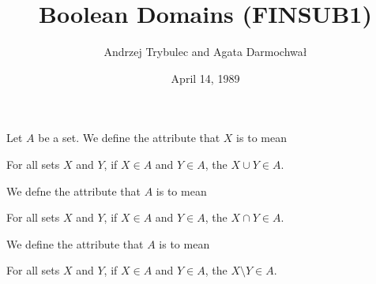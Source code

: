 \documentclass{article}
\title{Boolean Domains (FINSUB1)}
\author{Andrzej Trybulec and Agata Darmochwa\l}
\date{April 14, 1989}
\begin{document}
\maketitle

\begin{definition}
Let $A$ be a set.
We define the attribute that $X$ is  to mean
\begin{defn}
\item For all sets $X$ and $Y$, if $X\in A$ and $Y\in A$, the $X\cup Y\in A$.
\end{defn}
We defne the attribute that $A$ is  to mean
\begin{defn}
\item For all sets $X$ and $Y$, if $X\in A$ and $Y\in A$, the $X\cap Y\in A$.
\end{defn}
We define the attribute that $A$ is  to mean
\begin{defn}
\item For all sets $X$ and $Y$, if $X\in A$ and $Y\in A$, the $X\setminus Y\in A$.
\end{defn}
\end{definition}
\end{document}
